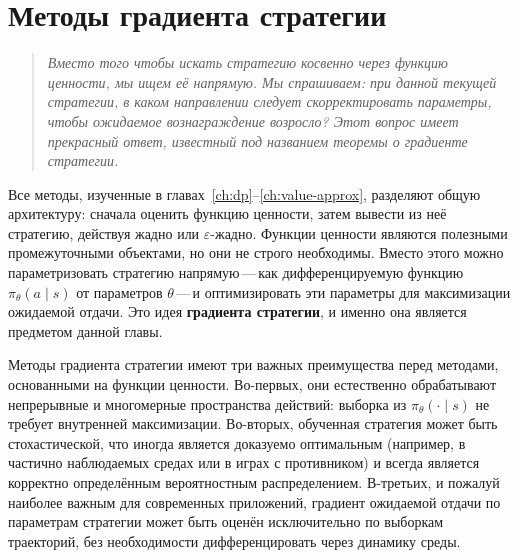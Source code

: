 \chapter{Методы градиента стратегии}
\label{ch:pg}

\begin{quote}
\itshape
Вместо того чтобы искать стратегию косвенно через функцию ценности, мы ищем её напрямую. Мы спрашиваем: при данной текущей стратегии, в каком направлении следует скорректировать параметры, чтобы ожидаемое вознаграждение возросло? Этот вопрос имеет прекрасный ответ, известный под названием теоремы о градиенте стратегии.
\end{quote}

\bigskip

Все методы, изученные в главах~\ref{ch:dp}--\ref{ch:value-approx}, разделяют общую архитектуру: сначала оценить функцию ценности, затем вывести из неё стратегию, действуя жадно или $\varepsilon$-жадно. Функции ценности являются полезными промежуточными объектами, но они не строго необходимы. Вместо этого можно параметризовать стратегию напрямую\,---\,как дифференцируемую функцию $\pi_\theta(a \mid s)$ от параметров $\theta$\,---\,и оптимизировать эти параметры для максимизации ожидаемой отдачи. Это идея \textbf{градиента стратегии}, и именно она является предметом данной главы.

Методы градиента стратегии имеют три важных преимущества перед методами, основанными на функции ценности. Во-первых, они естественно обрабатывают непрерывные и многомерные пространства действий: выборка из $\pi_\theta(\cdot \mid s)$ не требует внутренней максимизации. Во-вторых, обученная стратегия может быть стохастической, что иногда является доказуемо оптимальным (например, в частично наблюдаемых средах или в играх с противником) и всегда является корректно определённым вероятностным распределением. В-третьих, и пожалуй наиболее важным для современных приложений, градиент ожидаемой отдачи по параметрам стратегии может быть оценён исключительно по выборкам траекторий, без необходимости дифференцировать через динамику среды.

